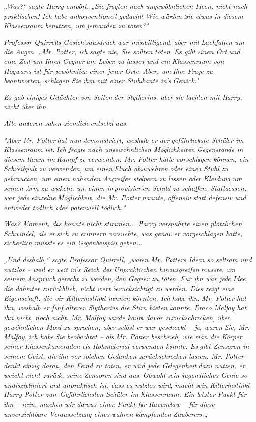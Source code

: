 {\emph{„Was?“ sagte Harry empört. „Sie} \emph{\emph{fragten}} \emph{nach ungewöhnlichen Ideen, nicht nach praktischen! Ich habe unkonventionell gedacht! Wie würden} \emph{\emph{Sie}} \emph{etwas in diesem Klassenraum benutzen, um jemanden zu töten?"}

\emph{Professor Quirrells Gesichtsausdruck war missbilligend, aber mit Lachfalten um die Augen. „Mr. Potter, ich sagte nie, Sie sollten} \emph{\emph{töten.}} \emph{Es gibt einen Ort und eine Zeit um Ihren Gegner am Leben zu lassen und ein Klassenraum von Hogwarts ist für gewöhnlich einer jener Orte. Aber, um Ihre Frage zu beantworten, schlagen Sie ihm mit einer Stuhlkante in's Genick."}

\emph{Es gab einiges Gelächter von Seiten der Slytherins, aber sie lachten mit Harry, nicht über ihn.}

\emph{Alle anderen sahen ziemlich entsetzt aus.}

\emph{"Aber Mr. Potter hat nun demonstriert, weshalb er der gefährlichste Schüler im Klassenraum ist. Ich fragte nach ungewöhnlichen Möglichkeiten Gegenstände in diesem Raum im Kampf zu verwenden. Mr. Potter hätte vorschlagen können, ein Schreibpult zu verwenden, um einen Fluch abzuwehren oder einen Stuhl zu gebrauchen, um einen nahenden Angreifer stolpern zu lassen oder Kleidung um seinen Arm zu wickeln, um einen improvisierten Schild zu schaffen. Stattdessen, war jede einzelne Möglichkeit, die Mr. Potter nannte, offensiv statt defensiv und entweder tödlich oder potenziell tödlich."}

\emph{Was? Moment, das konnte nicht stimmen... Harry verspührte einen} \emph{plötzlichen Schwindel, als er sich zu erinnern versuchte, was genau er} \emph{vorgeschlagen hatte, sicherlich musste es ein Gegenbeispiel geben...}

\emph{„Und deshalb,“ sagte Professor Quirrell, „waren Mr. Potters Ideen so seltsam und nutzlos -- weil er weit in's Reich des Unpraktischen hinausgreifen musste, um seinem Anspruch gerecht zu werden, den} \emph{\emph{Gegner zu töten.}} \emph{Für ihn war jede Idee, die dahinter zurückblieb, nicht wert berücksichtigt zu werden. Dies zeigt eine Eigenschaft, die wir} \emph{\emph{Killerinstinkt}} \emph{nennen könnten. Ich habe ihn. Mr. Potter hat ihn, weshalb er fünf älteren Slytherins die Stirn bieten konnte. Draco Malfoy hat ihn nicht, noch nicht. Mr. Malfoy würde kaum davor zurückschrecken, über gewöhnlichen Mord zu sprechen, aber selbst er war geschockt -- ja, waren Sie, Mr. Malfoy, ich habe Sie beobachtet -- als Mr. Potter beschrieb, wie man die Körper seiner Klassenkameraden als Rohmaterial verwenden könnte. Es gibt Zensoren in seinem Geist, die ihn vor solchen Gedanken zurückschrecken lassen. Mr. Potter denkt} \emph{\emph{einzig}} \emph{daran, den Feind zu töten, er wird jede Gelegenheit dazu nutzen, er weicht nicht zurück, seine Zensoren sind aus. Obwohl sein jugendliches Genie so undiszipliniert und unpraktisch ist, dass es nutzlos wird, macht sein} \emph{\emph{Killerinstinkt}} \emph{Harry Potter zum Gefährlichsten Schüler im Klassenraum. Ein letzter Punkt für ihn -- nein, machen wir daraus einen Punkt für Ravenclaw -- für diese unverzichtbare Voraussetzung eines wahren kämpfenden Zauberers.„}

}
